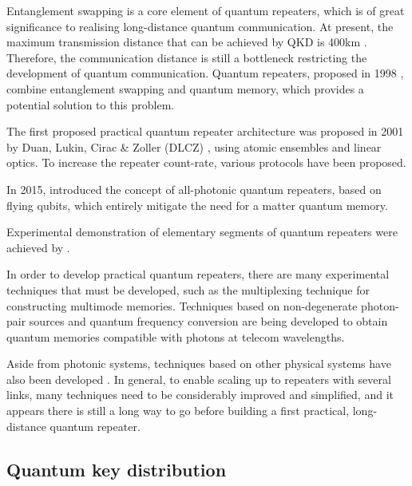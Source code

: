 \documentclass[aps,rmp,twocolumn,amsmath,amssymb,nofootinbib,superscriptaddress,longbibliography,floatfix,table-of-contents,eqsecnum]{revtex4-1}
\begin{document}
Entanglement swapping is a core element of quantum repeaters, which is of great significance to realising long-distance quantum communication. At present, the maximum transmission distance that can be achieved by QKD is 400km \cite{bib:arxiv_1606.06821}. Therefore, the communication distance is still a bottleneck restricting the development of quantum communication. Quantum repeaters, proposed in 1998 \cite{bib:PRL_81_5932}, combine entanglement swapping and quantum memory, which provides a potential solution to this problem.

The first proposed practical quantum repeater architecture was proposed in 2001 by Duan, Lukin, Cirac \& Zoller (DLCZ) \cite{bib:DLCZ}, using atomic ensembles and linear optics. To increase the repeater count-rate, various protocols \cite{bib:RMP_83_33, bib:PRA_79_042340, bib:PRA_92_012307, bib:PRA_81_052311, bib:PRA_81_052329, bib:NP_6_777, bib:PRL_112_250501} have been proposed.

In 2015, \cite{ncomms7787} introduced the concept of all-photonic quantum repeaters, based on flying qubits, which entirely mitigate the need for a matter quantum memory. 

Experimental demonstration of elementary segments of quantum repeaters were achieved by \cite{bib:Sc_316_1316, bib:Nat_454_1098}.

In order to develop practical quantum repeaters, there are many experimental techniques that must be developed, such as the multiplexing technique \cite{bib:PRA_76_050301, bib:PRA_82_010304, bib:PRL_113_053603, bib:PRL_98_060502} for constructing multimode memories. Techniques based on non-degenerate photon-pair sources \cite{bib:Nat_469_508, bib:Nat_469_512, bib:PRL_112_040504, bib:PRA_92_012329} and quantum frequency conversion \cite{bib:NP_6_894, bib:NC_5_3376} are being developed to obtain quantum memories compatible with photons at telecom wavelengths.

Aside from photonic systems, techniques based on other physical systems have also been developed \cite{bib:NP_11_37, bib:Sc_337_72, bib:N_484_195, bib:N_497_86}. In general, to enable scaling up to repeaters with several links, many techniques need to be considerably improved and simplified, and it appears there is still a long way to go before building a first practical, long-distance quantum repeater.

%
%

\subsection{Quantum key distribution} 
\end{document}

